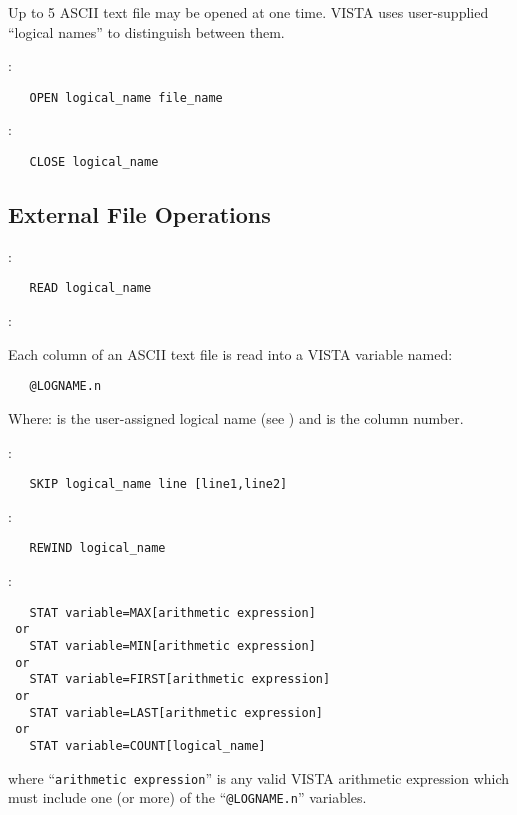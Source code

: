 Up to 5 ASCII text file may be opened at one time.  VISTA uses user-supplied
``logical names'' to distinguish between them.

\noindent {}:
\begin{verbatim}
   OPEN logical_name file_name
\end{verbatim}

\noindent {}:
\begin{verbatim}
   CLOSE logical_name
\end{verbatim}

\subsection{External File Operations}

:
\begin{verbatim}
   READ logical_name
\end{verbatim}

\noindent {}:

Each column of an ASCII text file is read into a VISTA variable
named:
\begin{verbatim}
   @LOGNAME.n
\end{verbatim}
Where:  is the user-assigned logical name (see )
and  is the column number.

\noindent {}:
\begin{verbatim}
   SKIP logical_name line [line1,line2]
\end{verbatim}

\noindent {}:
\begin{verbatim}
   REWIND logical_name
\end{verbatim}

\noindent {}:
\begin{verbatim}
   STAT variable=MAX[arithmetic expression]
 or
   STAT variable=MIN[arithmetic expression]
 or
   STAT variable=FIRST[arithmetic expression]
 or
   STAT variable=LAST[arithmetic expression]
 or
   STAT variable=COUNT[logical_name]
\end{verbatim}
where ``{\tt arithmetic expression}'' is any valid VISTA arithmetic expression
which must include one (or more) of the ``{\tt @LOGNAME.n}'' variables.

